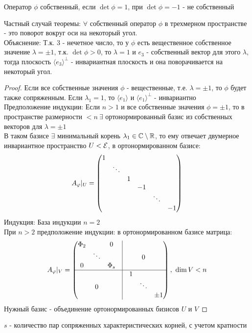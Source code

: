 \begin{definition}
    Оператор $\phi$ собственный, если $\det \phi = 1$, при $\det \phi = -1$ -  не собственный  
\end{definition}
Частный случай теоремы: $\forall$ собственный оператор $\phi$ в трехмерном пространстве - это поворот вокруг оси на некоторый угол.\\
Объяснение: Т.к. 3 - нечетное число, то у $\phi$ есть вещественное собственное значение $\lambda=\pm 1$, т.к. $\det \phi > 0$, то $\lambda=1$ и $e_3$ - собственный вектор для этого $\lambda$, тогда плоскость $\langle e_3 \rangle^{\bot}$ - инвариантная плоскость и она поворачивается на некоторый угол. 
\begin{proof}      
    Если все собственные значения $\phi$ - вещественные, т.е. $\lambda = \pm 1$, то $\phi$  будет также сопряженным. Если $\lambda_1 = 1$,  то $\langle e_1 \rangle$ и $\langle e_1 \rangle^\bot$  - инвариантно \\
    Предположение индукции: Если $n>1$ и все собственные значения $\phi = \pm 1$, то в пространстве размерности $<n \ \exists$ ортонормированный базис из собственных векторов для $\lambda = \pm 1$\\
    В таком базисе $\exists$ минимальный корень $\lambda_1 \in \mathbb{C}\setminus \mathbb{R}$, то ему отвечает двумерное инвариантное пространство $U < \mathcal{E}$, в ортонормированном базисе:
    $$A_{\phi}|_U = \begin{pmatrix}
        1 \\
        \null & \ddots \\
        \null & \null & 1\\
        \null & \null & \null & -1\\
        \null & \null & \null & \null & \ddots\\
        \null & \null & \null & \null & \null & -1
    \end{pmatrix}$$
    Индукция: База индукции $n = 2$\\ 
    При $n>2$ предположение индукции: в ортонормированном базисе матрица:
    $$A_\phi|_V = \begin{pmatrix}
    \Phi_2 & \null & 0 & \vline\\
    \null & \ddots & \null & \vline & \null & 0 \\
    0 & \null & \Phi_s & \vline \\ \hline 
    \null & \null & \null & \vline & 1 \\
    \null & 0 & \null & \vline & \null & \ddots \\
    \null & \null & \null & \vline & \null & \null & \pm 1 
    \end{pmatrix}, \ \dim V < n$$
    Нужный базис - объединение ортонормированных бизисов $U$ и $V$         
\end{proof}
\begin{remark}
    $s$ - количество пар сопряженных характеристических корней, с учетом кратности 
\end{remark} 
 
 